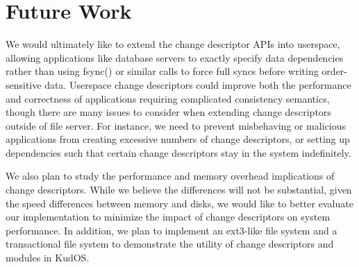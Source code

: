 \preparagraphspacing{}
\section*{Future Work}
\label{sec:future}

We would ultimately like to extend the change descriptor APIs into
userspace, allowing applications like database servers to exactly
specify data dependencies rather than using fsync() or similar calls
to force full syncs before writing order-sensitive data. Userspace
change descriptors could improve both the performance and correctness
of applications requiring complicated consistency semantics, though
there are many issues to consider when extending change descriptors
outside of file server. For instance, we need to prevent misbehaving
or malicious applications from creating excessive numbers of change
descriptors, or setting up dependencies such that certain change
descriptors stay in the system indefinitely.

We also plan to study the performance and memory overhead implications
of change descriptors. While we believe the differences will not be
substantial, given the speed differences between memory and disks, we
would like to better evaluate our implementation to minimize the impact
of change descriptors on system performance. In addition, we plan to
implement an ext3-like file system and a transactional file system to
demonstrate the utility of change descriptors and modules in KudOS.
